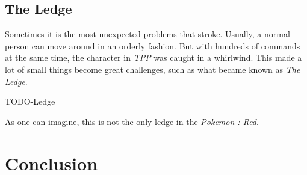 \documentclass[a4paper]{article}
\begin{document}
\subsection{The Ledge}

Sometimes it is the most unexpected problems that stroke. Usually, a normal person can move around in an orderly fashion. But with hundreds of commands at the same time, the character in \textit{TPP} was caught in a whirlwind. This made a lot of small things become great challenges, such as what became known as \textit{The Ledge}.

TODO-Ledge

As one can imagine, this is not the only ledge in the \textit{Pokemon : Red}.

\section{Conclusion}
\end{document}
